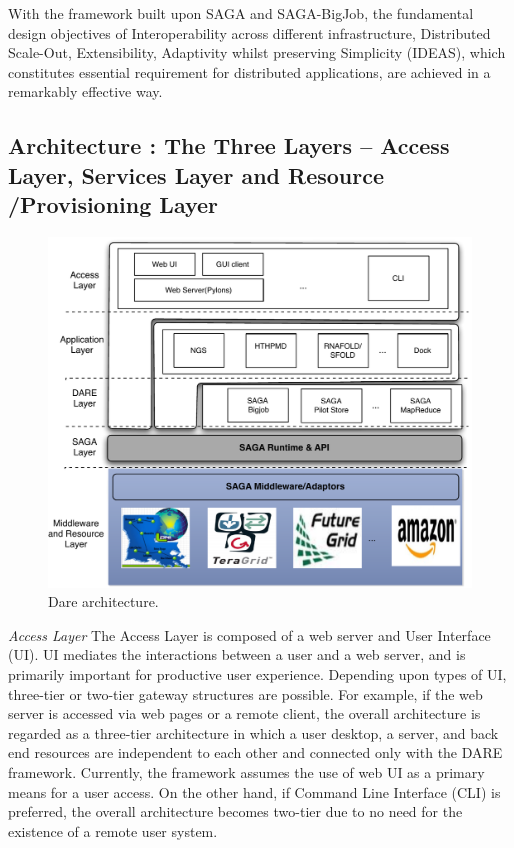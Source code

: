 \documentclass{sig-alternate}
\begin{document}
With the framework built upon SAGA and SAGA-BigJob, the fundamental design objectives of Interoperability across different infrastructure, Distributed Scale-Out, Extensibility, Adaptivity whilst preserving Simplicity (IDEAS), which constitutes essential requirement for distributed applications, are achieved in a remarkably effective way.


\subsection{Architecture : The Three Layers -- Access Layer, Services Layer and Resource /Provisioning Layer}

\begin{figure}
 \centering
\includegraphics[scale=0.40]{figures/DAREOutline.pdf}

\caption{\small Dare architecture.}
  \label{fig:dare-arch} 
\end{figure}

 

%


\textit{Access Layer}  The Access Layer is composed of a web server and User Interface (UI).  UI mediates the interactions between a user and a web server, and is primarily important for productive user experience.  Depending upon types of UI, three-tier or two-tier gateway structures are possible.  For example, if the web server is accessed via web pages or a remote client, the overall architecture is regarded as a three-tier architecture in which a user desktop, a server, and back end resources are independent to each other and connected only with the DARE framework.  Currently, the framework assumes the use of web UI as a primary means for a user access.  On the other hand, if Command Line Interface (CLI) is preferred, the overall architecture becomes two-tier due to no need for the existence of a remote user system.  
\end{document}
